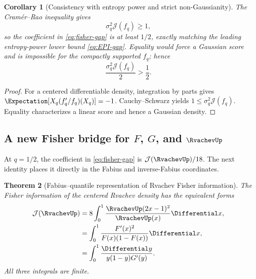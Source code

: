 \documentclass[11pt,oneside]{article}
\newtheorem{theorem}{Theorem}[section]
\newtheorem{corollary}[theorem]{Corollary}
\theoremstyle{definition}
\theoremstyle{remark}
\begin{document}
\begin{corollary}[Consistency with entropy power and strict non-Gaussianity]
\label{cor:CR-coefficient}
The Cram\'er--Rao inequality gives
\begin{equation}
 \sigma_q^2\mathcal J(f_q)\ge1,
 \label{eq:CR}
\end{equation}
so the coefficient in \eqref{eq:fisher-gap} is at least $1/2$, exactly matching
the leading entropy-power lower bound \eqref{eq:EPI-gap}.  Equality would force a
Gaussian score and is impossible for the compactly supported $f_q$; hence
\begin{equation}
 \frac{\sigma_q^2\mathcal J(f_q)}2>\frac12.
 \label{eq:strict-coefficient}
\end{equation}
\end{corollary}

\begin{proof}
For a centered differentiable density, integration by parts gives
$\Expectation[X_q(f_q'/f_q)(X_q)]=-1$.  Cauchy--Schwarz yields
$1\le\sigma_q^2\mathcal J(f_q)$.  Equality characterizes a linear score and hence
a Gaussian density.
\end{proof}

\subsection{A new Fisher bridge for $F$, $G$, and $\RvachevUp$}

At $q=1/2$, the coefficient in \eqref{eq:fisher-gap} is
$\mathcal J(\RvachevUp)/18$.  The next identity places it directly in the Fabius and
inverse-Fabius coordinates.

\begin{theorem}[Fabius--quantile representation of Rvachev Fisher information]
\label{thm:Fisher-bridge}
The Fisher information of the centered Rvachev density has the equivalent forms
\begin{align}
 \mathcal J(\RvachevUp)
 &=8\int_0^1\frac{\RvachevUp(2x-1)^2}{\RvachevUp(x)}\Differential x,
 \label{eq:Fisher-up-dilation}\\
 &=\int_0^1\frac{F'(x)^2}{F(x)(1-F(x))}\Differential x,
 \label{eq:Fisher-F}\\
 &=\int_0^1\frac{\Differential y}{y(1-y)G'(y)}.
 \label{eq:Fisher-G}
\end{align}
All three integrals are finite.
\end{theorem}
\end{document}
